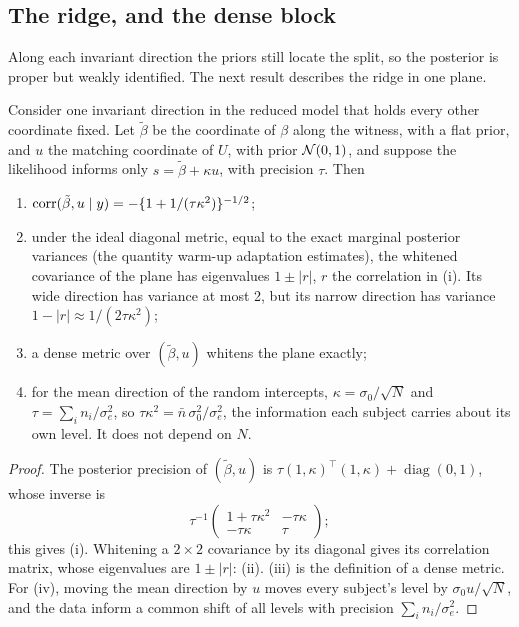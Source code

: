 \subsection{The ridge, and the dense block}

Along each invariant direction the priors still locate the split, so the
posterior is proper but weakly identified. The next result describes the
ridge in one plane.

\begin{proposition}\label{prop:ridge}
Consider one invariant direction in the reduced model that holds every
other coordinate fixed. Let $\tilde\beta$ be the coordinate of $\beta$ along
the witness, with a flat prior, and $u$ the matching coordinate of $U$,
with prior $\mathcal{N}(0,1)$, and suppose the likelihood informs only $s =
\tilde\beta + \kappa u$, with precision $\tau$. Then
\begin{enumerate}
\item[(i)] $\operatorname{corr}(\tilde\beta, u \mid y) = -\{1 + 1/(\tau\kappa^2)\}^{-1/2}$;
\item[(ii)] under the ideal diagonal metric, equal to the exact marginal
posterior variances (the quantity warm-up adaptation estimates), the
whitened covariance of the plane has eigenvalues $1 \pm |r|$, $r$ the
correlation in (i). Its wide direction has variance at most 2, but its
narrow direction has variance $1 - |r| \approx 1/(2\tau\kappa^2)$;
\item[(iii)] a dense metric over $(\tilde\beta, u)$ whitens the plane
exactly;
\item[(iv)] for the mean direction of the random intercepts, $\kappa =
\sigma_0/\sqrt{N}$ and $\tau = \sum_i n_i/\sigma_e^2$, so $\tau\kappa^2 =
\bar n\,\sigma_0^2/\sigma_e^2$, the information each subject carries about
its own level. It does not depend on $N$.
\end{enumerate}
\end{proposition}

\begin{proof}
The posterior precision of $(\tilde\beta, u)$ is $\tau (1, \kappa)^{\top}
(1, \kappa) + \operatorname{diag}(0, 1)$, whose inverse is
\[
\tau^{-1}\begin{pmatrix} 1 + \tau\kappa^2 & -\tau\kappa \\ -\tau\kappa
& \tau \end{pmatrix};
\]
this gives (i). Whitening a $2 \times 2$ covariance
by its diagonal gives its correlation matrix, whose eigenvalues are $1 \pm
|r|$: (ii). (iii) is the definition of a dense metric. For (iv), moving
the mean direction by $u$ moves every subject's level by $\sigma_0
u/\sqrt{N}$, and the data inform a common shift of all levels with
precision $\sum_i n_i / \sigma_e^2$.
\end{proof}

